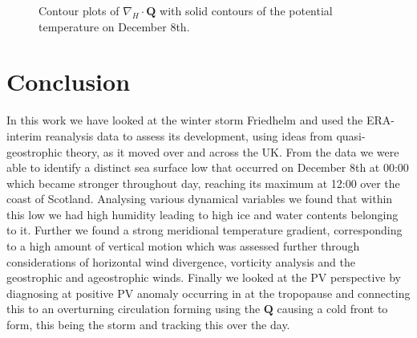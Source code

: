 \documentclass[12pt,a4paper]{article}
\begin{document}
\begin{figure}[H]
    \centering
        \caption{Contour plots of $\nabla_H \cdot \bm{Q}$ with solid contours of the potential temperature on December 8th. }
        \label{divQ}
\end{figure}
\section{Conclusion}
In this work we have looked at the winter storm Friedhelm and used the ERA-interim reanalysis data to assess its development, using ideas from quasi-geostrophic theory, as it moved over and across the UK. From the data we were able to identify a distinct sea surface low that occurred on December 8th at 00:00 which became stronger throughout day, reaching its maximum at 12:00 over the coast of Scotland. Analysing various dynamical variables we found that within this low we had high humidity leading to high ice and water contents belonging to it. Further we found a strong meridional temperature gradient, corresponding to a high amount of vertical motion which was assessed further through considerations of horizontal wind divergence, vorticity analysis and the geostrophic and ageostrophic winds. Finally we looked at the PV perspective by diagnosing at positive PV anomaly occurring in at the tropopause and connecting this to an overturning circulation forming using the $\bm{Q}$ causing a cold front to form, this being the storm and tracking this over the day. 


\end{document}
